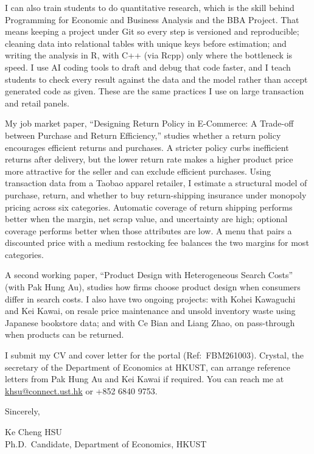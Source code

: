 \documentclass[11pt]{article}
\begin{document}
I can also train students to do quantitative research, which is the skill behind Programming for Economic and Business Analysis and the BBA Project. That means keeping a project under Git so every step is versioned and reproducible; cleaning data into relational tables with unique keys before estimation; and writing the analysis in R, with C++ (via Rcpp) only where the bottleneck is speed. I use AI coding tools to draft and debug that code faster, and I teach students to check every result against the data and the model rather than accept generated code as given. These are the same practices I use on large transaction and retail panels.

My job market paper, ``Designing Return Policy in E-Commerce: A Trade-off between Purchase and Return Efficiency,'' studies whether a return policy encourages efficient returns and purchases. A stricter policy curbs inefficient returns after delivery, but the lower return rate makes a higher product price more attractive for the seller and can exclude efficient purchases. Using transaction data from a Taobao apparel retailer, I estimate a structural model of purchase, return, and whether to buy return-shipping insurance under monopoly pricing across six categories. Automatic coverage of return shipping performs better when the margin, net scrap value, and uncertainty are high; optional coverage performs better when those attributes are low. A menu that pairs a discounted price with a medium restocking fee balances the two margins for most categories.

A second working paper, ``Product Design with Heterogeneous Search Costs'' (with Pak Hung Au), studies how firms choose product design when consumers differ in search costs. I also have two ongoing projects: with Kohei Kawaguchi and Kei Kawai, on resale price maintenance and unsold inventory waste using Japanese bookstore data; and with Ce Bian and Liang Zhao, on pass-through when products can be returned.

I submit my CV and cover letter for the portal (Ref:\ FBM261003). Crystal, the secretary of the Department of Economics at HKUST, can arrange reference letters from Pak Hung Au and Kei Kawai if required. You can reach me at \href{mailto:khsu@connect.ust.hk}{khsu@connect.ust.hk} or +852 6840 9753.

\vspace{0.2em}
Sincerely,

\vspace{0.2em}
Ke Cheng HSU \\
Ph.D.\ Candidate, Department of Economics, HKUST
\end{document}
